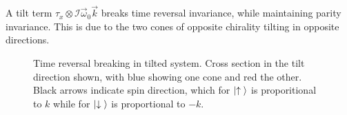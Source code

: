 A tilt term \(\tau _{x} \otimes \mathcal{I} \vec{\omega} _{0} \vec{k}\) breaks time reversal invariance, while maintaining parity invariance.
This is due to the two cones of opposite chirality tilting in opposite directions.

\begin{figure}[h]
  \centering
  \caption{Time reversal breaking in tilted system.
    Cross section in the tilt direction shown, with blue showing one cone and red the other.
    Black arrows indicate spin direction, which for \(\ket{\uparrow {}}\) is proporitional to  \(k\) while for \(\ket{\downarrow {}}\) is proportional to \( -k \).
  }
\end{figure}
